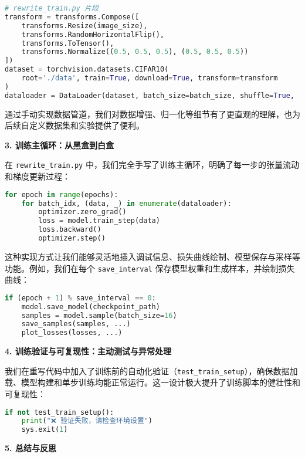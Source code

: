 \documentclass{ctexart}
\begin{document}
\begin{lstlisting}[language=python]
# rewrite_train.py 片段
transform = transforms.Compose([
    transforms.Resize(image_size),
    transforms.RandomHorizontalFlip(),
    transforms.ToTensor(),
    transforms.Normalize((0.5, 0.5, 0.5), (0.5, 0.5, 0.5))
])
dataset = torchvision.datasets.CIFAR10(
    root='./data', train=True, download=True, transform=transform
)
dataloader = DataLoader(dataset, batch_size=batch_size, shuffle=True, ...)
\end{lstlisting}

通过手动实现数据管道，我们对数据增强、归一化等细节有了更直观的理解，也为后续自定义数据集和实验提供了便利。

\vspace{0.5em}
\noindent
\textbf{3. 训练主循环：从黑盒到白盒}

在 \texttt{rewrite\_train.py} 中，我们完全手写了训练主循环，明确了每一步的张量流动和梯度更新过程：

\begin{lstlisting}[language=python]
for epoch in range(epochs):
    for batch_idx, (data, _) in enumerate(dataloader):
        optimizer.zero_grad()
        loss = model.train_step(data)
        loss.backward()
        optimizer.step()
\end{lstlisting}

这种实现方式让我们能够灵活地插入调试信息、损失曲线绘制、模型保存与采样等功能。例如，我们在每个 \texttt{save\_interval} 保存模型权重和生成样本，并绘制损失曲线：

\begin{lstlisting}[language=python]
if (epoch + 1) % save_interval == 0:
    model.save_model(checkpoint_path)
    samples = model.sample(batch_size=16)
    save_samples(samples, ...)
    plot_losses(losses, ...)
\end{lstlisting}

\vspace{0.5em}
\noindent
\textbf{4. 训练验证与可复现性：主动测试与异常处理}

我们在重写代码中加入了训练前的自动化验证（\texttt{test\_train\_setup}），确保数据加载、模型构建和单步训练均能正常运行。这一设计极大提升了训练脚本的健壮性和可复现性：

\begin{lstlisting}[language=python]
if not test_train_setup():
    print("❌ 验证失败，请检查环境设置")
    sys.exit(1)
\end{lstlisting}

\vspace{0.5em}
\noindent
\textbf{5. 总结与反思}
\end{document}
